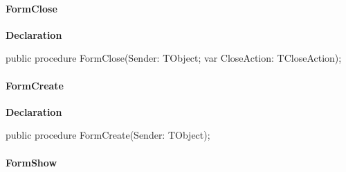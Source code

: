 \documentclass{report}
\newif\ifpdf
\begin{document}
\paragraph*{FormClose}\hspace*{\fill}

\label{updexec.TUExecFm-FormClose}
\begin{list}{}{
\setlength{\itemindent}{0cm}
\setlength{\listparindent}{0cm}
\setlength{\leftmargin}{\evensidemargin}
\addtolength{\leftmargin}{\tmplength}
\settowidth{\labelsep}{X}
\addtolength{\leftmargin}{\labelsep}
\setlength{\labelwidth}{\tmplength}
}
\item[\textbf{Declaration}\hfill]
\ifpdf
\begin{flushleft}
\fi
\begin{ttfamily}
public procedure FormClose(Sender: TObject; var CloseAction: TCloseAction);\end{ttfamily}

\ifpdf
\end{flushleft}
\fi

\end{list}
\paragraph*{FormCreate}\hspace*{\fill}

\label{updexec.TUExecFm-FormCreate}
\begin{list}{}{
\setlength{\itemindent}{0cm}
\setlength{\listparindent}{0cm}
\setlength{\leftmargin}{\evensidemargin}
\addtolength{\leftmargin}{\tmplength}
\settowidth{\labelsep}{X}
\addtolength{\leftmargin}{\labelsep}
\setlength{\labelwidth}{\tmplength}
}
\item[\textbf{Declaration}\hfill]
\ifpdf
\begin{flushleft}
\fi
\begin{ttfamily}
public procedure FormCreate(Sender: TObject);\end{ttfamily}

\ifpdf
\end{flushleft}
\fi

\end{list}
\paragraph*{FormShow}\hspace*{\fill}
\end{document}
